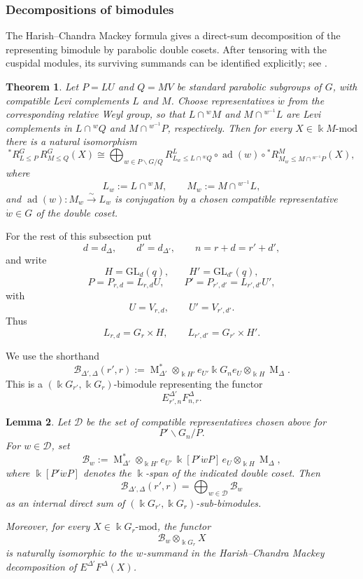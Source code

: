 \documentclass[12pt]{amsart}
\numberwithin{itemcounter}{subsection}
\theoremstyle{plain}
\newtheorem{theorem}{Theorem}[section]
\newtheorem{lemma}[theorem]{Lemma}
\theoremstyle{definition}
\theoremstyle{remark}
\numberwithin{equation}{section}
\def\k{\Bbbk}
\def\GL{\mathrm{GL}}
\def\M{{\operatorname{M}\nolimits}}
\begin{document}
\subsubsection{Decompositions of bimodules}\label{sec:decomposition}

The Harish--Chandra Mackey formula gives a direct-sum decomposition of the
representing bimodule by parabolic double cosets.  After tensoring with the
cuspidal modules, its surviving summands can be identified explicitly; see \cite{DM}.

\begin{theorem}\label{thm:HC-Mackey}
Let \(P=LU\) and \(Q=MV\) be standard parabolic subgroups of \(G\), with
compatible Levi complements \(L\) and \(M\). Choose representatives \(\dot w\)
from the corresponding relative Weyl group, so that
\(L\cap{}^wM\) and \(M\cap{}^{w^{-1}}L\) are Levi complements in
\(L\cap{}^wQ\) and \(M\cap{}^{w^{-1}}P\), respectively.
Then for every \(X\in \k M\text{-mod}\) there is
a natural isomorphism
\[
{}^*\!R^G_{L\le P}\,R^G_{M\le Q}(X)
\cong
\bigoplus_{w\in P\backslash G/Q}
R^L_{L_w\le L\cap{}^wQ}
\circ \operatorname{ad}(w)\circ
{}^*\!R^M_{M_w\le M\cap{}^{w^{-1}}P}(X),
\]
where
\[
L_w:=L\cap{}^wM,\qquad M_w:=M\cap{}^{w^{-1}}L,
\]
and \(\operatorname{ad}(w):M_w\xrightarrow{\sim}L_w\) is conjugation by a
chosen compatible representative \(\dot w\in G\) of the double coset.
\end{theorem}

For the rest of this subsection put
\[
d=d_\Delta,\qquad d'=d_{\Delta'},\qquad
n=r+d=r'+d',
\]
and write
\[
H=\GL_d(q),\qquad H'=\GL_{d'}(q),
\]
\[
P=P_{r,d}=L_{r,d}U,\qquad
P'=P_{r',d'}=L_{r',d'}U',
\]
with
\[
U=V_{r,d},\qquad U'=V_{r',d'}.
\]
Thus
\[
L_{r,d}=G_r\times H,
\qquad
L_{r',d'}=G_{r'}\times H'.
\]

We use the shorthand
\[
\mathscr B_{\Delta',\Delta}(r',r)
:=
\M_{\Delta'}^*
\otimes_{\k H'}
e_{U'}\k G_ne_U
\otimes_{\k H}
\M_\Delta.
\]
This is a \((\k G_{r'},\k G_r)\)-bimodule representing the functor
\[
E^{\Delta'}_{r',n}F^\Delta_{n,r}.
\]

\begin{lemma}
\label{lem:finite-double-coset-bimodule}
Let \(\mathcal D\) be the set of compatible representatives chosen above for
\[
P'\backslash G_n/P.
\]
For \(w\in\mathcal D\), set
\[
\mathscr B_w
:=
\M_{\Delta'}^*
\otimes_{\k H'}
e_{U'}\,\k[P'\dot wP]\,e_U
\otimes_{\k H}
\M_\Delta,
\]
where \(\k[P'\dot wP]\) denotes the \(\k\)-span of the indicated double
coset. Then
\begin{equation}\label{eq:bimodule-double-coset-direct-sum}
\mathscr B_{\Delta',\Delta}(r',r)
=
\bigoplus_{w\in\mathcal D}\mathscr B_w
\end{equation}
as an internal direct sum of
\((\k G_{r'},\k G_r)\)-sub-bimodules.

Moreover, for every \(X\in\k G_r\text{-mod}\), the functor
\[
\mathscr B_w\otimes_{\k G_r}X
\]
is naturally isomorphic to the \(w\)-summand in the Harish--Chandra Mackey
decomposition of \(E^{\Delta'}F^\Delta(X)\).
\end{lemma}
\end{document}
